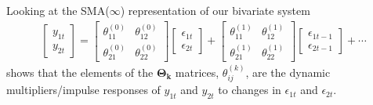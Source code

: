\documentclass[a4paper,11pt,listof=nochaptergap,oneside,pointednumbers,bibtotoc,bigheadings,liststotoc,hidelinks]{scrbook}
\theoremstyle{mysatz}
\theoremstyle{mydefinition}
\theoremstyle{mytheorem}
\theoremstyle{mybemerkung}
\newcommand{\vect}[1]{\boldsymbol{\mathbf{#1}}}
\begin{document}
Looking at the SMA($\infty$) representation of our bivariate system 
\begin{equation} \label{eq:svar9}
\begin{split}
	\begin{bmatrix}
    	y_{1t} \\
    	y_{2t}
 	\end{bmatrix} 
	=
	\begin{bmatrix}
    	\theta_{11}^{(0)} & \theta_{12}^{(0)}\\
    	\theta_{21}^{(0)} & \theta_{22}^{(0)}
 	\end{bmatrix} 
	\begin{bmatrix}
    	\epsilon_{1t} \\
	\epsilon_{2t}
 	\end{bmatrix} + 
	\begin{bmatrix}
    	\theta_{11}^{(1)} & \theta_{12}^{(1)}\\
    	\theta_{21}^{(1)} & \theta_{22}^{(1)}
 	\end{bmatrix} 
	\begin{bmatrix}
    	\epsilon_{1t-1} \\
	\epsilon_{2t-1}
 	\end{bmatrix} + \cdots 
\end{split}								
\end{equation}
shows that the elements of the $\vect{\Theta_k}$ matrices, $\theta_{ij}^{(k)}$, are the dynamic multipliers/impulse responses of $y_{1t}$ and $y_{2t}$ to changes in $\epsilon_{1t}$ and $\epsilon_{2t}$.\\
\end{document}
